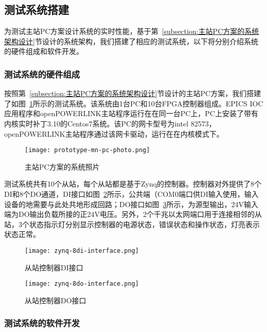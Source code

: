 \subsection{测试系统搭建}

为测试主站PC方案设计系统的实时性能，基于第~\ref{subsection:主站PC方案的系统架构设计}节设计的系统架构，我们搭建了相应的测试系统，以下将分别介绍系统的硬件组成和软件开发。

\subsubsection{测试系统的硬件组成} 

按照第~\ref{subsection:主站PC方案的系统架构设计}节设计的主站PC方案，我们搭建了如图~\ref{fig:prototype-mn-pc-photo}所示的测试系统。该系统由1台PC和10台FPGA控制器组成。EPICS IOC应用程序和openPOWERLINK主站程序运行在在同一台PC上，PC上安装了带有内核实时补丁3.10的Centos7系统。该PC的网卡型号为intel 82573，openPOWERLINK主站程序通过该网卡驱动，运行在在内核模式下。

\begin{figure}[!htb]
	\centering
	\texttt{[image: prototype-mn-pc-photo.png]}
	\caption{主站PC方案的系统照片}
	\label{fig:prototype-mn-pc-photo}
\end{figure}


测试系统共有10个从站，每个从站都是基于Zynq的控制器。控制器对外提供了8个DI和8个DO通道，DI接口如图~\ref{fig:zynq-8di-interface}所示，公共端（COM0端口供DI输入使用，输入设备的地需要与此处共地形成回路；DO接口如图~\ref{fig:zynq-8do-interface}所示，为源型输出，24V输入端为DO输出负载所接的正24V电压。另外，2个千兆以太网端口用于连接相邻的从站，3个状态指示灯分别显示控制器的电源状态，错误状态和操作状态，灯亮表示状态正常。

\begin{figure}[!htb]
	\centering
	\texttt{[image: zynq-8di-interface.png]}
	\caption{从站控制器DI接口}
	\label{fig:zynq-8di-interface}
\end{figure}

\begin{figure}[!htb]
	\centering
	\texttt{[image: zynq-8do-interface.png]}
	\caption{从站控制器DO接口}
	\label{fig:zynq-8do-interface}
\end{figure}

\subsubsection{测试系统的软件开发}

